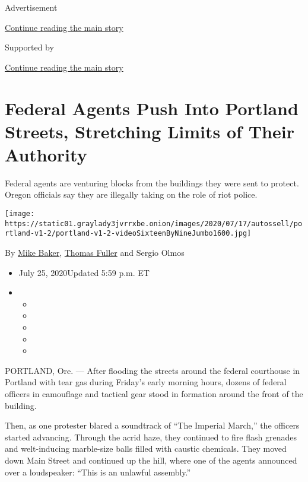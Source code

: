 Advertisement

\protect\hyperlink{after-top}{Continue reading the main story}

Supported by

\protect\hyperlink{after-sponsor}{Continue reading the main story}

\hypertarget{federal-agents-push-into-portland-streets-stretching-limits-of-their-authority}{%
\section{Federal Agents Push Into Portland Streets, Stretching Limits of
Their
Authority}\label{federal-agents-push-into-portland-streets-stretching-limits-of-their-authority}}

Federal agents are venturing blocks from the buildings they were sent to
protect. Oregon officials say they are illegally taking on the role of
riot police.

\texttt{[image: https://static01.graylady3jvrrxbe.onion/images/2020/07/17/autossell/portland-v1-2/portland-v1-2-videoSixteenByNineJumbo1600.jpg]}

By \href{https://www.nytimes3xbfgragh.onion/by/mike-baker}{Mike Baker},
\href{https://www.nytimes3xbfgragh.onion/by/thomas-fuller}{Thomas
Fuller} and Sergio Olmos

\begin{itemize}
\item
  July 25, 2020Updated 5:59 p.m. ET
\item
  \begin{itemize}
  \item
  \item
  \item
  \item
  \item
  \end{itemize}
\end{itemize}

PORTLAND, Ore. --- After flooding the streets around the federal
courthouse in Portland with tear gas during Friday's early morning
hours, dozens of federal officers in camouflage and tactical gear stood
in formation around the front of the building.

Then, as one protester blared a soundtrack of ``The Imperial March,''
the officers started advancing. Through the acrid haze, they continued
to fire flash grenades and welt-inducing marble-size balls filled with
caustic chemicals. They moved down Main Street and continued up the
hill, where one of the agents announced over a loudspeaker: ``This is an
unlawful assembly.''

